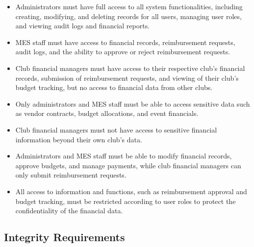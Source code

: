 \documentclass[12pt]{article}
\begin{document}
\begin{itemize}
  \item Administrators must have full access to all system functionalities, including creating, modifying, and deleting records for all users, managing user roles, and viewing audit logs and financial reports.
  \item MES staff must have access to financial records, reimbursement requests, audit logs, and the ability to approve or reject reimbursement requests.
  \item Club financial managers must have access to their respective club's financial records, submission of reimbursement requests, and viewing of their club's budget tracking, but no access to financial data from other clubs.
  \item Only administrators and MES staff must be able to access sensitive data such as vendor contracts, budget allocations, and event financials.
  \item Club financial managers must not have access to sensitive financial information beyond their own club's data.
  \item Administrators and MES staff must be able to modify financial records, approve budgets, and manage payments, while club financial managers can only submit reimbursement requests.
  \item All access to information and functions, such as reimbursement approval and budget tracking, must be restricted according to user roles to protect the confidentiality of the financial data.
\end{itemize}

\subsection{Integrity Requirements}
\end{document}
